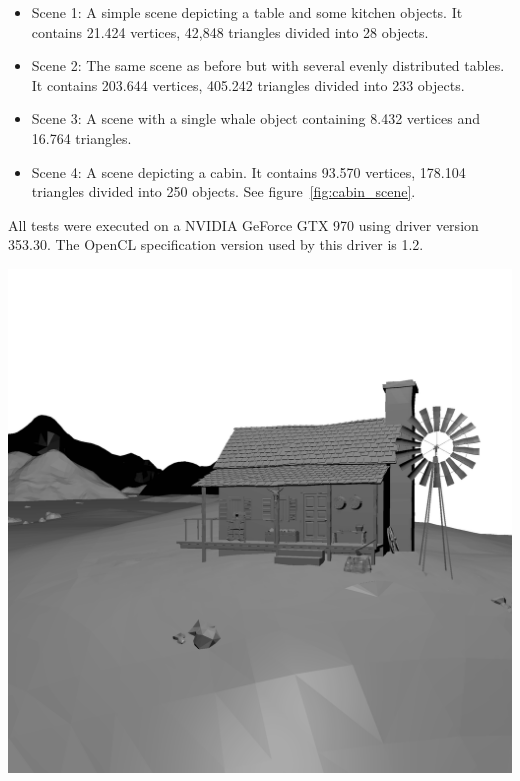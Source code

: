 \documentclass[a0,portrait]{a0poster}
\begin{document}
\begin{multicols}{2}
\begin{itemize}
\item Scene 1: A simple scene depicting a table and some kitchen
  objects. It contains 21.424 vertices, 42,848 triangles divided into
  28 objects.
\item Scene 2: The same scene as before but with several evenly
  distributed tables. It contains 203.644 vertices, 405.242 triangles
  divided into 233 objects.
\item Scene 3: A scene with a single whale object containing 8.432
  vertices and 16.764 triangles.
\item Scene 4: A scene depicting a cabin. It contains 93.570 vertices,
  178.104 triangles divided into 250 objects. See
  figure~\ref{fig:cabin_scene}.
\end{itemize}

All tests were executed on a NVIDIA GeForce GTX 970 using driver
version 353.30. The OpenCL specification version used by this driver
is 1.2.

\begin{center}\vspace{1cm}
\includegraphics[width=0.8\linewidth]{cabin}
\label{fig:cabin_scene}
\end{center}\vspace{1cm}



\end{multicols}
\end{document}

